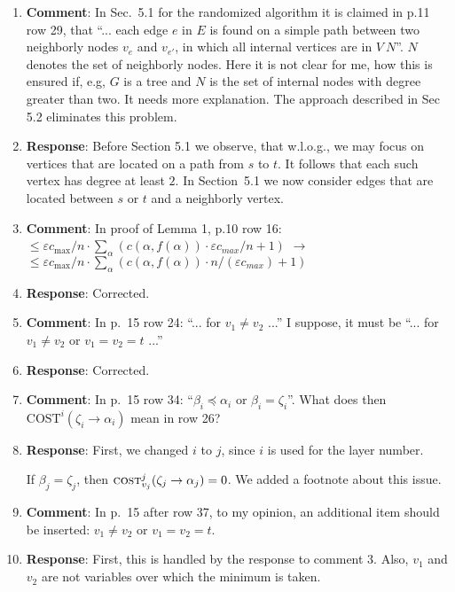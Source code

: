 \documentclass[11pt]{article}
\newcommand{\eps}{\varepsilon}
\begin{document}
\begin{enumerate}

\item \textbf{Comment}: In Sec.~5.1 for the randomized algorithm it is
  claimed in p.11 row 29, that ``... each edge $e$ in $E$ is found on
  a simple path between two neighborly nodes $v_e$ and $v_{e'}$, in
  which all internal vertices are in $V \ N$''.  $N$ denotes the set
  of neighborly nodes. Here it is not clear for me, how this is ensured
  if, e.g, $G$ is a tree and $N$ is the set of internal nodes with
  degree greater than two.  It needs more explanation. The approach
  described in Sec 5.2 eliminates this problem.

\item[] \textbf{Response}: Before Section 5.1 we observe, that
  w.l.o.g., we may focus on vertices that are located on a path from
  $s$ to $t$.  It follows that each such vertex has degree at least
  $2$.
%
  In Section~5.1 we now consider edges that are located between $s$ or
  $t$ and a neighborly vertex.
  
\item \textbf{Comment}: In proof of Lemma 1, p.10 row 16: $\leq \eps
  c_{\max} / n \cdot \sum_\alpha (c(\alpha,f(\alpha))\cdot \eps
  c_{max} / n + 1)$ $\longrightarrow$ $\leq \eps c_{\max} / n \cdot
  \sum_\alpha (c(\alpha,f(\alpha))\cdot n / (\eps c_{max}) + 1)$

\item[] \textbf{Response}: Corrected.

\item \textbf{Comment}: In p.~15 row 24: ``... for $v_1 \neq v_2$
  ...'' I suppose, it must be ``... for $v_1 \neq v_2$ or $v_1 = v_2 =
  t$ ...''

\item[] \textbf{Response}: Corrected.

\item \textbf{Comment}: In p.~15 row 34: ``$\beta_i \preceq \alpha_i$
  or $\beta_i = \zeta_i$''.  What does then $\text{COST}^i(\zeta_i \to
  \alpha_i)$ mean in row 26?

\item[] \textbf{Response}: First, we changed $i$ to $j$, since $i$ is
  used for the layer number.

  If $\beta_j = \zeta_j$, then $\textsc{cost}^j_{v_j}(\zeta_j \to
  \alpha_j) = 0$.  We added a footnote about this issue.

\item \textbf{Comment}: In p.~15 after row 37, to my opinion, an
  additional item should be inserted: $v_1 \neq v_2$ or $v_1 = v_2 =
  t$.

\item[] \textbf{Response}: First, this is handled by the response to
  comment 3.  Also, $v_1$ and $v_2$ are not variables over which the
  minimum is taken.

\end{enumerate}
\end{document}
